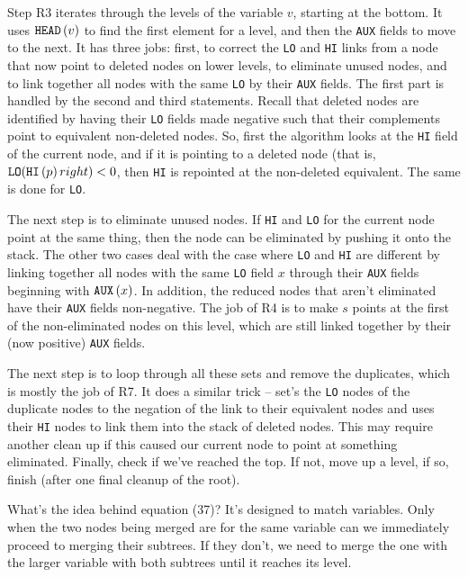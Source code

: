 Step R3 iterates through the levels of the variable $v$, starting at
the bottom.  It uses ${\tt HEAD}\left(v\right)$ to find the first element for a 
level, and then the {\tt AUX} fields to move to the next.  It has three jobs:
first, to correct the {\tt LO} and {\tt HI} links from a node that now point
to deleted nodes on lower levels, to eliminate unused nodes,
and to link together all nodes with the same {\tt LO} by their
{\tt AUX} fields.
The first part is handled by the second and third statements.  Recall
that deleted nodes are identified by having their {\tt LO} fields
made negative such that their complements point to equivalent 
non-deleted nodes.  So, first the algorithm looks at the {\tt HI}
field of the current node, and if it is pointing to a deleted node
(that is, ${\tt LO}({\tt HI}\left(p\right)right) < 0$, then {\tt HI}
is repointed at the non-deleted equivalent.  The same is done
for {\tt LO}.  

The next step is to eliminate unused nodes. If {\tt HI} and {\tt LO} for the current node
point at the same thing, then the node can be eliminated by pushing it onto
the stack.  The other two cases deal with the case where {\tt LO}
and {\tt HI} are different by linking together all nodes with the same
{\tt LO} field $x$ through their {\tt AUX} fields beginning with ${\tt AUX}\left(x\right)$.
In addition, the reduced nodes that aren't eliminated have their {\tt AUX} fields 
non-negative.  The job of R4 is to make $s$ points at the first of the 
non-eliminated nodes on this level, which are still linked together by their
(now positive) {\tt AUX} fields.

The next step is to loop through all these sets and remove the duplicates,
which is mostly the job of R7.  It does a similar trick -- set's the {\tt LO}
nodes of the duplicate nodes to the negation of the link to their equivalent
nodes and uses their {\tt HI} nodes to link them into the stack of deleted
nodes.  This may require another clean up if this caused our current node
to point at something eliminated.  Finally, check if we've reached the top.
If not, move up a level, if so, finish (after one final cleanup of the root).

\vskip 0.08in 

\noindent [p 218] What's the idea behind equation (37)?  It's designed
to match variables.  Only when the two nodes being merged are
for the same variable can we immediately proceed to merging their
subtrees.  If they don't, we need to merge the one with the larger
variable with both subtrees until it reaches its level.

